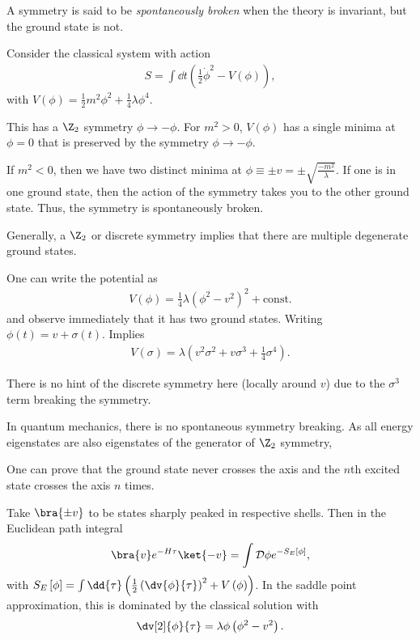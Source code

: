 
\begin{definition}
    A symmetry is said to be \emph{spontaneously broken} when the theory is invariant, but the ground state is not.
\end{definition}

Consider the classical system with action
\begin{align}
    S = \int \dd{t} \left( \frac{1}{2}\dot{\phi}^2 - V \left( \phi \right)  \right) 
,\end{align}
with $V \left( \phi \right) = \frac{1}{2}m^2 \phi^2 + \frac{1}{4}\lambda \phi^{4}$.

This has a $\Z_2$ symmetry $\phi \to - \phi$. For $m^2 > 0$, $V\left( \phi \right) $ has a single minima at $\phi = 0$ that is preserved by the symmetry $\phi \to -\phi$.


If $m^2 < 0$, then we have two distinct minima at $\phi \equiv \pm v = \pm \sqrt{\frac{-m^2}{\lambda}} $. If one is in one ground state, then the action of the symmetry takes you to the other ground state. Thus, the symmetry is spontaneously broken.

Generally, a $\Z_2$ or discrete symmetry implies that there are multiple degenerate ground states.

One can write the potential as
\begin{align}
    V \left( \phi \right) = \frac{1}{4}\lambda \left( \phi^2 - v^2 \right)^2 + \text{const}.
\end{align}
and observe immediately that it has two ground states. Writing $\phi \left( t \right) = v + \sigma \left( t \right) $. Implies
\begin{align}
    V \left( \sigma \right) = \lambda \left( v^2 \sigma^2 + v \sigma^3 + \frac{1}{4}\sigma^{4} \right) 
.\end{align}

There is no hint of the discrete symmetry here (locally around $v$) due to the $\sigma^3$ term breaking the symmetry.

In quantum mechanics, there is no spontaneous symmetry breaking. As all energy eigenstates are also eigenstates of the generator of $\Z_2$ symmetry,


One can prove that the ground state never crosses the axis and the $n$th excited state crosses the axis $n$ times.

Take $\bra{\pm v}$ to be states sharply peaked in respective shells. Then in the Euclidean path integral
\begin{align}
    \bra{v} e^{-H\tau} \ket{-v} = \int \mathcal{D} \phi e^{-S_E \left[ \phi \right] }
,\end{align}
with $S_E \left[ \phi \right] = \int \dd{\tau} \left( \frac{1}{2} \left( \dv{\phi}{\tau} \right)^2 + V\left( \phi \right)  \right) $. In the saddle point approximation, this is dominated by the classical solution with
\begin{align}
    \dv[2]{\phi}{\tau} = \lambda \phi \left( \phi^2 - v^2 \right) 
.\end{align}

